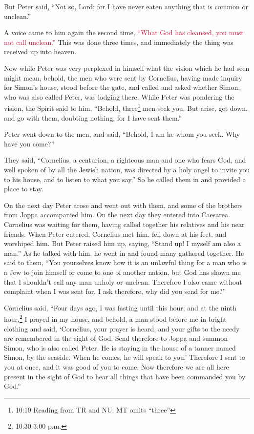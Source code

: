 \myverse{}But Peter said, “Not so, Lord; for I have never eaten anything
that is common or unclean.”

\myverse{}A voice came to him again the second time,
\textcolor{crimson}{“What God has cleansed, you must not call unclean.”}
\myverse{}This was done three times, and immediately the thing was received up into
heaven.

\myverse{}Now while Peter was very perplexed in himself what the vision
which he had seen might mean, behold, the men who were sent by Cornelius, having made inquiry for Simon’s
house, stood before the gate,
\myverse{}and called and asked whether Simon, who was also called Peter, was lodging
there.
\myverse{}While Peter was pondering the vision, the Spirit said to him, “Behold, three\footnote{10:19 Reading from TR and NU. MT omits “three”} men seek you.
\myverse{}But arise, get down, and go with them, doubting nothing; for I have sent
them.”

\myverse{}Peter went down to the men, and said, “Behold, I am he whom
you seek. Why have you come?”

\myverse{}They said, “Cornelius, a centurion, a righteous man and one
who fears God, and well spoken of by all the Jewish nation, was directed by a holy angel to invite you
to his house, and to listen to what you say.”
\myverse{}So he called them in and provided a place to stay.

On the next day Peter arose and went out with them, and some of the brothers from Joppa accompanied
him.
\myverse{}On the next day they entered into Caesarea. Cornelius was waiting for them,
having called together his relatives and his near friends.
\myverse{}When Peter entered, Cornelius met him, fell down at his feet, and worshiped
him.
\myverse{}But Peter raised him up, saying, “Stand up! I myself am also a man.”
\myverse{}As he talked with him, he went in and found many gathered together.
\myverse{}He said to them, “You yourselves know how it is an unlawful thing for a man
who is a Jew to join himself or come to one of another nation, but God has shown me that I shouldn’t call
any man unholy or unclean.
\myverse{}Therefore I also came without complaint when I was sent for. I ask therefore,
why did you send for me?”

\myverse{}Cornelius said, “Four days ago, I was fasting until this hour;
and at the ninth hour,\footnote{10:30 3:00 p.m.} I prayed in my house, and behold, a man stood before me in bright clothing
\myverse{}and said, ‘Cornelius, your prayer is heard, and your gifts to the needy are
remembered in the sight of God.
\myverse{}Send therefore to Joppa and summon Simon, who is also called Peter. He is
staying in the house of a tanner named Simon, by the seaside. When he comes, he will speak to you.’
\myverse{}Therefore I sent to you at once, and it was good of you to come. Now therefore
we are all here present in the sight of God to hear all things that have been commanded you by God.”

